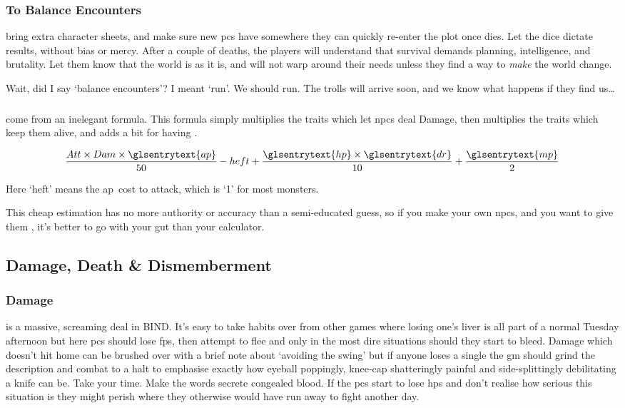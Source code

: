 \begin{multicols}{2}
\subsubsection{To Balance Encounters}
bring extra character sheets, and make sure new \glspl{pc} have somewhere they can quickly re-enter the plot once  dies.
Let the dice dictate results, without bias or mercy.
After a couple of deaths, the players will understand that survival demands planning, intelligence, and brutality.
Let them know that the world is as it is, and will not warp around their needs unless they find a way to \emph{make} the world change.

Wait, did I say `balance encounters'?
I meant `run'.
We should run.
The trolls will arrive soon, and we know what happens if they find us\ldots

\subsubsection{}
come from an inelegant formula.
This formula simply multiplies the \glspl{trait} which let \glspl{npc} deal Damage, then multiplies the \glspl{trait} which keep them alive, and adds a bit for having .

\begin{align*}
  \frac{Att \times Dam \times \glsentrytext{ap}}{50}
  -
  heft
  +
  \frac{\glsentrytext{hp} \times \glsentrytext{dr}}{10}
  +
  \frac{\glsentrytext{mp}}{2}
\end{align*}

\noindent
Here `heft' means the \gls{ap}~cost to attack, which is `1' for most \glspl{monster}.

This cheap estimation has no more authority or accuracy than a semi-educated guess, so if you make your own \glspl{npc}, and you want to give them , it's better to go with your gut than your calculator.

\subsection{Damage, Death \& Dismemberment}

\subsubsection{Damage}
is a massive, screaming deal in BIND.
It's easy to take habits over from other games where losing one's liver is all part of a normal Tuesday afternoon but here \glspl{pc} should lose \glspl{fp}, then attempt to flee and only in the most dire situations should they start to bleed.
Damage which doesn't hit home can be brushed over with a brief note about `avoiding the swing' but if anyone loses a single  the \gls{gm} should grind the description and combat to a halt to emphasise exactly how eyeball poppingly, knee-cap shatteringly painful and side-splittingly debilitating a knife can be.
Take your time.
Make the words secrete congealed blood.
If the \glspl{pc} start to lose \glspl{hp} and don't realise how serious this situation is they might perish where they otherwise would have run away to fight another day.


\end{multicols}
